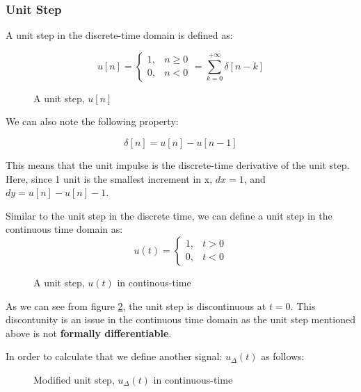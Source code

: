 \documentclass[letterpaper,12pt]{article}
\begin{document}
\newpage
\subsubsection*{Unit Step}
A unit step in the discrete-time domain is defined as:

\[u[n] =
    \begin{cases}
        1, & n \geq 0 \\
        0, & n < 0
    \end{cases}
    = \sum_{k=0}^{+\infty} \delta[n-k]\]

\begin{figure}[!ht]
    \centering
    
    \caption{A unit step, $u[n]$}\label{fig:unit_step}
\end{figure}

We can also note the following property:

\[\delta [n] = u[n] - u[n-1]\]

This means that the unit impulse is the discrete-time derivative of the unit step. Here, since 1 unit is the smallest increment in x, $dx = 1$, and $dy = u[n] - u[n] - 1$.

Similar to the unit step in the discrete time, we can define a unit step in the continuous time domain as:
\[u(t) =
    \begin{cases}
        1, & t > 0 \\
        0, & t < 0
    \end{cases}\]

\begin{figure}[!ht]
    \centering
    
    \caption{A unit step, $u(t)$ in continous-time}\label{fig:unit_step_cont_dom}
\end{figure}

As we can see from figure \ref{fig:unit_step_cont_dom}, the unit step is discontinuous at $t=0$. This discontunity is an issue in the continuous time domain as the unit step mentioned above is not \textbf{formally differentiable}.

In order to calculate that we define another signal: $u_{\Delta}(t)$ as follows:

\begin{figure}[!ht]
    \centering
    
    \caption{Modified unit step, $u_{\Delta}(t)$ in continuous-time}\label{fig:unit_step_cont_dom_delta}
\end{figure}
\end{document}
